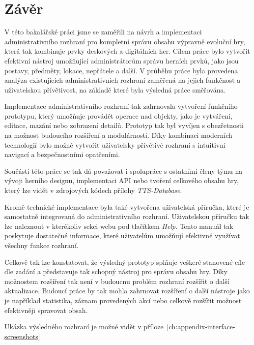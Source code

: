 \chapter{Závěr}
\label{ch:conclusion}

V této bakalářské práci jsme se zaměřili na návrh a implementaci administrativního rozhraní pro kompletní správu obsahu výpravně evoluční hry, která tak kombinuje prvky deskových a digitálních her. Cílem práce bylo vytvořit efektivní nástroj umožňující administrátorům správu herních prvků, jako jsou postavy, předměty, lokace, nepřátele a další. V průběhu práce byla provedena analýza existujících administrativních rozhraní zaměřená na jejich funkčnost a uživatelskou přívětivost, na základě které byla výsledná práce směřována.

Implementace administrativního rozhraní tak zahrnovala vytvoření funkčního prototypu, který umožňuje provádět operace nad objekty, jako je vytváření, editace, mazání nebo zobrazení detailů. Prototyp tak byl vyvíjen s obezřetnosti na možnost budoucího rozšíření a modulárnosti. Díky kombinaci moderních technologií bylo možné vytvořit uživatelsky přívětivé rozhraní s intuitivní navigací a bezpečnostními opatřeními.

Součástí této práce se tak dá považovat i spolupráce s ostatními členy týmu na vývoji herního designu, implementaci API nebo tvoření celkového obsahu hry, který lze vidět v zdrojových kódech přílohy \textit{TTS-Database}.

Kromě technické implementace byla také vytvořena uživatelská příručka, které je samostatně integrovaná do administrativního rozhraní. Uživatelskou příručku tak lze naleznout v kterékoliv sekci webu pod tlačítkem \textit{Help}. Tento manuál tak poskytuje dostatečné informace, které uživatelům umožňují efektivně využívat všechny funkce rozhraní.

Celkově tak lze konstatovat, že výsledný prototyp splňuje veškeré stanovené cíle dle zadání a představuje tak schopný nástroj pro správu obsahu hry. Díky možnostem rozšíření tak není v budoucnu problém rozhraní rozšířit o další aktualizace. Budoucí práce by tak mohla zahrnovat rozšíření o další nástroje jako je například statistika, záznam provedených akcí nebo celkově rozšířit možnost efektivněji spravovat obsah.

Ukázka výsledného rozhraní je možné vidět v příloze~\ref{ch:appendix-interface-screenshots}

\endinput